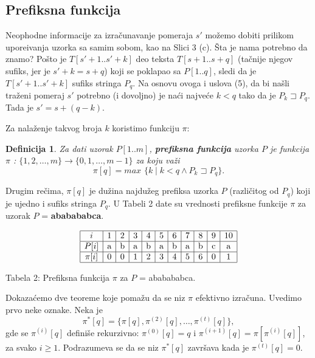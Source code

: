 \documentclass[a4paper,12pt]{article}
\newtheorem{dfn}{Definicija}[section]
\begin{document}
\subsection{Prefiksna funkcija}

Neophodne informacije za izra\v cunavanje pomeraja $s'$ mo\v zemo dobiti prilikom upore\dj ivanja uzorka sa samim sobom, kao na Slici 3 (c). \v Sta je nama potrebno da znamo? Po\v sto je $T[s' + 1..s' + k]$ deo teksta $T[s + 1..s + q]$ (ta\v cnije njegov sufiks, jer je $s' + k = s + q$) koji se poklapao sa $P[1..q]$, sledi da je $T[s' + 1..s' + k]$ sufiks stringa $P_q$. Na osnovu ovoga i uslova (5), da bi na\v sli tra\v zeni pomeraj $s'$ potrebno (i dovoljno) je na\' ci najve\' ce $k < q$ tako da je $P_k \sqsupset P_q$. Tada je $s' = s + (q - k)$.

Za nala\v zenje takvog broja $k$ koristimo funkciju $\pi$:

\begin{dfn}

Za dati uzorak $P[1..m]$, {\bf prefiksna funkcija} uzorka $P$ je funkcija $\pi$ : $\{1, 2, \ldots, m\} \rightarrow \{0, 1, \ldots, m - 1\}$ za koju va\v zi $$\pi[q] = max\phantom{i}\{k \mid k < q \wedge P_k \sqsupset P_q\}.$$

\end{dfn}

Drugim re\v cima, $\pi[q]$ je du\v zina najdu\v zeg prefiksa uzorka $P$ (razli\v citog od $P_q$) koji je ujedno i sufiks stringa $P_q$. U Tabeli 2 date su vrednosti prefiksne funkcije $\pi$ za uzorak $P$ = {\bf ababababca}.

\begin{center}
\begin{displaymath}
\begin{array}{|c|c|c|c|c|c|c|c|c|c|c|}
\hline i & 1 & 2 & 3 & 4 & 5 & 6 & 7 & 8 & 9 & 10 \\
\hline P[i] & $a$ & $b$ & $a$ & $b$ & $a$ & $b$ & $a$ & $b$ & $c$ & $a$ \\
\hline \pi[i] & 0 & 0 & 1 & 2 & 3 & 4 & 5 & 6 & 0 & 1 \\
\hline
\end{array}
\end{displaymath}
\end{center}

\begin{center}
Tabela 2: Prefiksna funkcija $\pi$ za $P$ = ababababca.
\end{center}

Dokaza\' cemo dve teoreme koje poma\v zu da se niz $\pi$ efektivno izra\v cuna. Uvedimo prvo neke oznake. Neka je $$ \pi^\ast[q] = \{\pi[q], \pi^{(2)}[q], \ldots, \pi^{(t)}[q] \}, $$ gde se $\pi^{(i)}[q]$ defini\v se rekurzivno: $\pi^{(0)}[q] = q$ i $\pi^{(i+1)}[q] = \pi[\pi^{(i)}[q]]$, za svako $i \geq 1$. Podrazumeva se da se niz $\pi^\ast[q]$ zavr\v sava kada je $\pi^{(t)}[q] = 0$.
\end{document}
